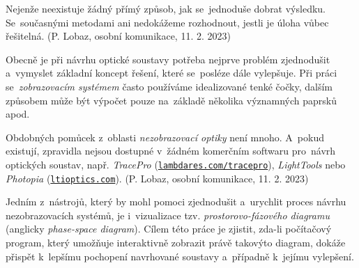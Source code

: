 Nejenže neexistuje žádný přímý způsob, jak se~jednoduše dobrat výsledku. Se~současnými metodami ani nedokážeme rozhodnout, jestli je úloha vůbec řešitelná. (P. Lobaz, osobní komunikace, 11. 2. 2023)

Obecně je při návrhu optické soustavy potřeba nejprve problém zjednodušit a~vymyslet základní koncept řešení, které se~posléze dále vylepšuje. Při práci se~\emph{zobrazovacím systémem} často používáme idealizované tenké čočky, dalším způsobem může být výpočet pouze na~základě několika významných paprsků apod.

Obdobných pomůcek z~oblasti \emph{nezobrazovací optiky} není mnoho. A~pokud existují, zpravidla nejsou dostupné v~žádném komerčním softwaru pro~návrh optických soustav, např. \emph{TracePro} (\texttt{\href{http://lambdares.com/tracepro}{lambdares.com/tracepro}}), \emph{LightTools} nebo \emph{Photopia} (\texttt{\href{http://www.ltioptics.com/}{ltioptics.com}}). (P. Lobaz, osobní komunikace, 11. 2. 2023)

Jedním z~nástrojů, který by mohl pomoci zjednodušit a~urychlit proces návrhu nezobrazovacích systémů, je i~vizualizace tzv. \emph{prostorovo-fázového diagramu} (anglicky \emph{phase-space diagram}). \parencite{mushaveck2022designing} Cílem této práce je zjistit, zda-li počítačový program, který umožňuje interaktivně zobrazit právě takovýto diagram, dokáže přispět k~lepšímu pochopení navrhované soustavy a~případně k~jejímu vylepšení.